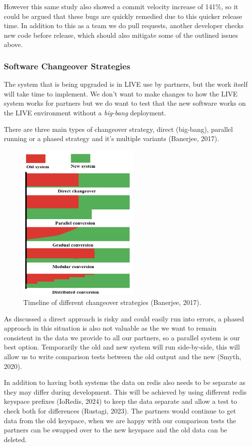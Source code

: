   However this same study also showed a commit velocity increase of 141\%, so it could be argued that these bugs are quickly remedied due to this quicker 
  release time. In addition to this as a team we do pull requests, another developer checks new code before release, which should also mitigate some 
  of the outlined issues above.

  \subsubsection{Software Changeover Strategies}
  The system that is being upgraded is in LIVE use by partners, but the work itself will take time to implement. We don't want to make changes to how
  the LIVE system works for partners but we do want to test that the new software works on the LIVE environment without a \textit{big-bang} deployment.

  There are three main types of changeover strategy, direct (big-bang), parallel running or a phased strategy and it's multiple variants (Banerjee, 2017). 
  
  \begin{figure}[H]
    \centering
    \includegraphics[width=6cm]{assets/changeoverStrategies.png}
    \caption{Timeline of different changeover strategies (Banerjee, 2017).}
    \label{fig:changeoverStrategies}
  \end{figure}
  
  As discussed a direct approach is risky and could easily run into errors, a phased approach in this situation is also not valuable as the we want 
  to remain consistent in the data we provide to all our partners, so a parallel system is our best option. Temporarily the old and new system will 
  run side-by-side, this will allow us to write comparison tests between the old output and the new (Smyth, 2020).

  In addition to having both systems the data on redis also needs to be separate as they may differ during development. This will be achieved by 
  using different redis keyspace prefixes (IoRedis, 2024) to keep the data separate and allow a test to check both for differences (Rustagi, 2023). 
  The partners would continue to get data from the old keyspace, when we are happy with our comparison tests the partners can be swapped over to the new 
  keyspace and the old data can be deleted. 

\newpage
